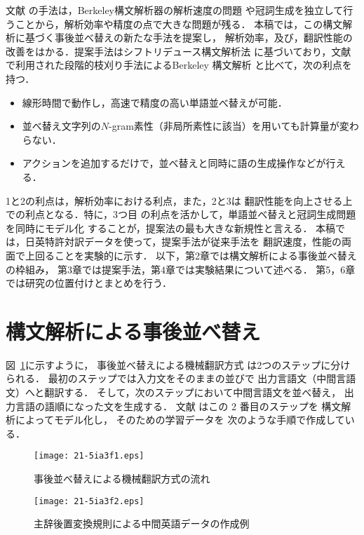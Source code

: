 \documentclass[japanese]{jnlp_1.4}
\begin{document}
文献 \cite{Goto:12}の手法は，Berkeley構文解析器の解析速度の問題
や冠詞生成を独立して行うことから，解析効率や精度の点で大きな問題が残る．
本稿では，この構文解析に基づく事後並べ替えの新たな手法を提案し，
解析効率，及び，翻訳性能の改善をはかる．提案手法はシフトリデュース構文解析法
に基づいており，文献 \cite{Goto:12}で利用された段階的枝刈り手法によるBerkeley
構文解析 \cite{Petrov:07}と比べて，次の利点を持つ．
\begin{itemize}
\item[1] 線形時間で動作し，高速で精度の高い単語並べ替えが可能．
\item[2] 並べ替え文字列の$N$-gram素性（非局所素性に該当）を用いても計算量が変わらない．
\item[3] アクションを追加するだけで，並べ替えと同時に語の生成操作などが行える．
\end{itemize}
1と2の利点は，解析効率における利点，また，2と3は
翻訳性能を向上させる上での利点となる．特に，3つ目
の利点を活かして，単語並べ替えと冠詞生成問題を同時にモデル化
することが，提案法の最も大きな新規性と言える．
本稿では，日英特許対訳データを使って，提案手法が従来手法を
翻訳速度，性能の両面で上回ることを実験的に示す．
以下，第2章では構文解析による事後並べ替えの枠組み，
第3章では提案手法，第4章では実験結果について述べる．
第5，6章では研究の位置付けとまとめを行う．


\section{構文解析による事後並べ替え}
\label{sec:post}

図~\ref{fig:flow}に示すように，
事後並べ替えによる機械翻訳方式 \cite{Sudoh:11}
は2つのステップに分けられる．
最初のステップでは入力文をそのままの並びで
出力言語文（中間言語文）へと翻訳する．
そして，次のステップにおいて中間言語文を並べ替え，
出力言語の語順になった文を生成する．
文献 \cite{Goto:12}はこの 2 番目のステップを
構文解析によってモデル化し，
そのための学習データを
次のような手順で作成している．

\begin{figure}[b]
\begin{center}
\texttt{[image: 21-5ia3f1.eps]}
\end{center}
\caption{事後並べ替えによる機械翻訳方式の流れ}
\label{fig:flow}
\end{figure}
\begin{figure}[b]
\begin{center}
\texttt{[image: 21-5ia3f2.eps]}
\end{center}
\caption{主辞後置変換規則による中間英語データの作成例}
\label{fig:treealign}
\end{figure}
\end{document}
